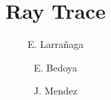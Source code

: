 \documentclass{book}
\begin{document}
\title{Ray Trace}
\author{
	E. Larra\~{n}aga\\
  \and
  E. Bedoya\\
  \and
  J. Mendez\\
}


\maketitle




\end{document}
